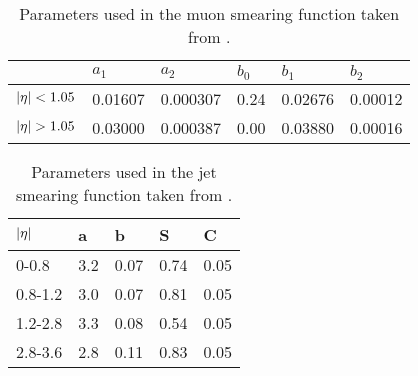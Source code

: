 
\begin{table}[H]
\renewcommand{\arraystretch}{1.5} %
\begin{center}
\begin{tabular}{|l|l|l|l|l|l|}
\hline
 &$a_1$&$a_2$&$b_0$&$b_1$&$b_2$ \\ \hline
$|\eta|<1.05$&0.01607&0.000307&0.24&0.02676&0.00012 \\ \hline
$\abs{\eta}>1.05$&0.03000&0.000387&0.00&0.03880&0.00016 \\ \hline
\end{tabular}
\end{center}
\caption{Parameters used in the muon smearing function taken from \citep{ATL-PHYS-PUB-2013-004}.}
\label{tab:muonparam}
\renewcommand{\arraystretch}{1.0} %
\end{table}
\begin{table}[H]
\renewcommand{\arraystretch}{1.5} %
\begin{center}
\begin{tabular}{|l|l|l|l|l|}
\hline
$|\eta|$&a&b&S&C \\ \hline
0-0.8&3.2&0.07&0.74&0.05 \\
0.8-1.2&3.0&0.07&0.81&0.05 \\
1.2-2.8&3.3&0.08&0.54&0.05 \\
2.8-3.6&2.8&0.11&0.83&0.05 \\ \hline
\end{tabular}
\end{center}
\caption{Parameters used in the jet smearing function taken from \citep{ATL-PHYS-PUB-2013-004}.}
\label{tab:jetparam}
\renewcommand{\arraystretch}{1.0} %
\end{table}

